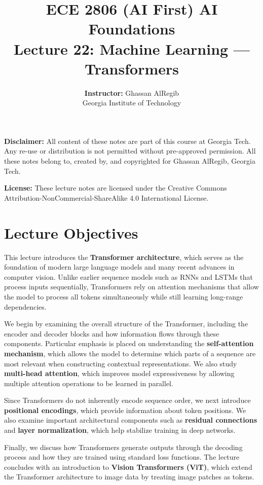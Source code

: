 \documentclass[11pt]{article}
\title{\vspace{-1.5cm}
\textbf{ECE 2806 (AI First) AI Foundations} \\[6pt]
\Large Lecture 22: Machine Learning --- Transformers}
\author{
\textbf{Instructor:} Ghassan AlRegib \\[4pt]
\small Georgia Institute of Technology
}
\date{}
\begin{document}
\maketitle
\thispagestyle{fancy}

\noindent
\textbf{Disclaimer:} All content of these notes are part of this course at Georgia Tech. Any re-use or distribution is not permitted without pre-approved permission. All these notes belong to, created by, and copyrighted for Ghassan AlRegib, Georgia Tech.

\vspace{6pt}
\noindent
\textbf{License:} These lecture notes are licensed under the Creative Commons Attribution-NonCommercial-ShareAlike 4.0 International License.

\section{Lecture Objectives}

This lecture introduces the \textbf{Transformer architecture}, which serves as the foundation of modern large language models and many recent advances in computer vision. Unlike earlier sequence models such as RNNs and LSTMs that process inputs sequentially, Transformers rely on attention mechanisms that allow the model to process all tokens simultaneously while still learning long-range dependencies.

We begin by examining the overall structure of the Transformer, including the encoder and decoder blocks and how information flows through these components. Particular emphasis is placed on understanding the \textbf{self-attention mechanism}, which allows the model to determine which parts of a sequence are most relevant when constructing contextual representations. We also study \textbf{multi-head attention}, which improves model expressiveness by allowing multiple attention operations to be learned in parallel.

Since Transformers do not inherently encode sequence order, we next introduce \textbf{positional encodings}, which provide information about token positions. We also examine important architectural components such as \textbf{residual connections} and \textbf{layer normalization}, which help stabilize training in deep networks.

Finally, we discuss how Transformers generate outputs through the decoding process and how they are trained using standard loss functions. The lecture concludes with an introduction to \textbf{Vision Transformers (ViT)}, which extend the Transformer architecture to image data by treating image patches as tokens.
\end{document}
